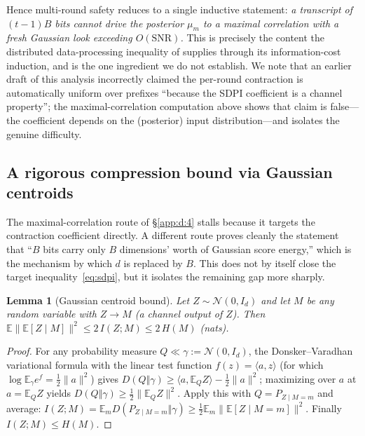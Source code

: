 \documentclass[11pt]{article}
\newtheorem{lemma}{Lemma}
\theoremstyle{definition}
\newcommand{\E}{\mathbb{E}}
\newcommand{\Ncal}{\mathcal{N}}
\begin{document}
\noindent Hence multi-round safety reduces to a single inductive statement: \emph{a transcript of
$(t-1)B$ bits cannot drive the posterior $\mu_m$ to a maximal correlation with a fresh Gaussian look
exceeding $O(\mathrm{SNR})$.} This is precisely the content the distributed data-processing inequality of
\citet{braverman2016ddpi} supplies through its information-cost induction, and is the one ingredient we
do not establish. We note that an earlier draft of this analysis incorrectly claimed the per-round
contraction is automatically uniform over prefixes ``because the SDPI coefficient is a channel
property''; the maximal-correlation computation above shows that claim is false---the coefficient
depends on the (posterior) input distribution---and isolates the genuine difficulty.

\subsection{A rigorous compression bound via Gaussian centroids}\label{app:d:6}

The maximal-correlation route of \S\ref{app:d:4} stalls because it targets the contraction coefficient directly.
A different route proves cleanly the statement that ``$B$ bits carry only $B$ dimensions' worth of
Gaussian score energy,'' which is the mechanism by which $d$ is replaced by $B$. This does not by itself
close the target inequality~\eqref{eq:sdpi}, but it isolates the remaining gap more sharply.

\begin{lemma}[Gaussian centroid bound]
\label{lem:centroid}
Let $Z\sim\Ncal(0,I_d)$ and let $M$ be any random variable with $Z\to M$ (a channel output of $Z$).
Then $\E\big\|\E[Z\mid M]\big\|^2\le 2\,I(Z;M)\le 2\,H(M)$ (nats).
\end{lemma}

\begin{proof}
For any probability measure $Q\ll\gamma:=\Ncal(0,I_d)$, the Donsker--Varadhan variational formula
\citep[Lemma~6.2.13]{dembozeitouni1998} with the
linear test function $f(z)=\langle a,z\rangle$ (for which $\log\E_\gamma e^{f}=\tfrac12\|a\|^2$) gives
$D(Q\Vert\gamma)\ge\langle a,\E_Q Z\rangle-\tfrac12\|a\|^2$; maximizing over $a$ at $a=\E_Q Z$ yields
$D(Q\Vert\gamma)\ge\tfrac12\|\E_Q Z\|^2$. Apply this with $Q=P_{Z\mid M=m}$ and average:
$I(Z;M)=\E_m D(P_{Z\mid M=m}\Vert\gamma)\ge\tfrac12\E_m\|\E[Z\mid M=m]\|^2$. Finally $I(Z;M)\le H(M)$.
\end{proof}
\end{document}
